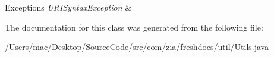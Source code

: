 \begin{DoxyExceptions}{Exceptions}
{\em U\-R\-I\-Syntax\-Exception} & \\
\hline
\end{DoxyExceptions}


The documentation for this class was generated from the following file\-:\begin{DoxyCompactItemize}
\item 
/\-Users/mac/\-Desktop/\-Source\-Code/src/com/zia/freshdocs/util/\hyperlink{_utils_8java}{Utils.\-java}\end{DoxyCompactItemize}
